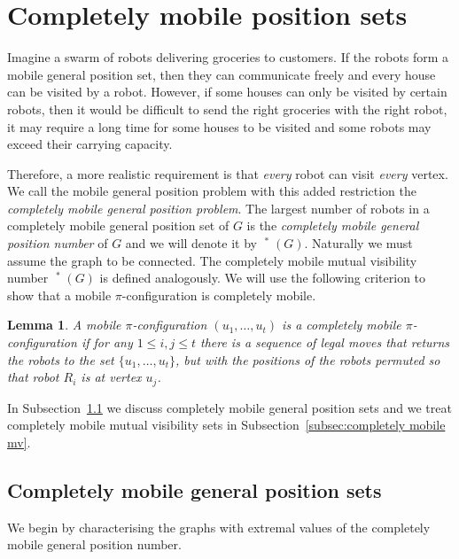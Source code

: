 \documentclass[a4paper,12pt]{article}
\DeclareMathOperator{\mob}{Mob_{gp}}
\DeclareMathOperator{\mobmv}{Mob_{\mu}}
\newtheorem{lemma}[theorem]{Lemma}
\theoremstyle{definition}
\begin{document}
	\section{Completely mobile position sets}\label{sec:completely mobile}
	
	Imagine a swarm of robots delivering groceries to customers. If the robots form a mobile general position set, then they can communicate freely and every house can be visited by a robot. However, if some houses can only be visited by certain robots, then it would be difficult to send the right groceries with the right robot, it may require a long time for some houses to be visited and some robots may exceed their carrying capacity. 
	
	Therefore, a more realistic requirement is that \emph{every} robot can visit \emph{every} vertex. We call the mobile general position problem with this added restriction the \emph{completely mobile general position problem}. The largest number of robots in a completely mobile general position set of $G$ is the \emph{completely mobile general position number} of $G$ and we will denote it by $\mob ^*(G)$. Naturally we must assume the graph to be connected. The completely mobile mutual visibility number $\mobmv ^*(G)$ is defined analogously. We will use the following criterion to show that a mobile $\pi $-configuration is completely mobile. 
	
	
	
	\begin{lemma}\label{lem:swapping}
		A mobile $\pi $-configuration $(u_1,\dots ,u_t)$ is a completely mobile $\pi $-configuration if for any $1 \leq i,j \leq t$ there is a sequence of legal moves that returns the robots to the set $\{ u_1,\dots ,u_t\} $, but with the positions of the robots permuted so that robot $R_i$ is at vertex $u_j$.
	\end{lemma}
	
	In Subsection~\ref{subsec:completely mobile gp} we discuss completely mobile general position sets and we treat completely mobile mutual visibility sets in Subsection~\ref{subsec:completely mobile mv}.
	
	\subsection{Completely mobile general position sets}\label{subsec:completely mobile gp}
	
	We begin by characterising the graphs with extremal values of the completely mobile general position number. 
	
\end{document}
